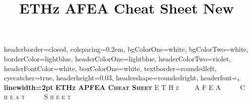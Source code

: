 \documentclass[landscape,a0paper,fontscale=0.285]{baposter} %
\title{ETHz AFEA Cheat Sheet New}
\begin{document}
\begin{poster}
{
headerborder=closed, %
colspacing=0.2em, %
bgColorOne=white, %
bgColorTwo=white, %
borderColor=lightblue, %
headerColorOne=lightblue, %
headerColorTwo=violet, %
headerFontColor=white, %
boxColorOne=white, %
textborder=roundedleft, %
eyecatcher=true, %
headerheight=0.03\textheight, %
headershape=roundedright, %
headerfont=\Large\bf\textsc, %
linewidth=2pt %
}
{\bf\textsc{ETHz APFEA Cheat Sheet}\vspace{0.0em}} %
{\textsc{E T H z \ \ \ \ A F E A \ \ \ \ \ C h e a t \ \ \ \ \ S h e e t \hspace{0pt}}}


\end{poster}
\end{document}
